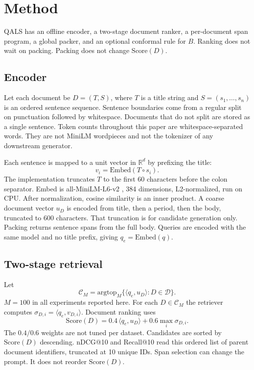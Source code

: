 \documentclass[preprint,12pt,authoryear]{elsarticle}
\begin{document}
\section{Method}
QALS has an offline encoder, a two-stage document ranker, a per-document span program, a global packer, and an optional conformal rule for \(B\). Ranking does not wait on packing. Packing does not change \(\mathrm{Score}(D)\).

\subsection{Encoder}
Let each document be \(D=(T,S)\), where \(T\) is a title string and \(S=(s_1,\ldots,s_n)\) is an ordered sentence sequence. Sentence boundaries come from a regular split on punctuation followed by whitespace. Documents that do not split are stored as a single sentence. Token counts throughout this paper are whitespace-separated words. They are not MiniLM wordpieces and not the tokenizer of any downstream generator.

Each sentence is mapped to a unit vector in \(\mathbb{R}^d\) by prefixing the title:
\begin{equation}
v_i=\mathrm{Embed}(T\circ s_i).
\end{equation}
The implementation truncates \(T\) to the first 60 characters before the colon separator. Embed is all-MiniLM-L6-v2 \citep{reimers2019sentence}, 384 dimensions, L2-normalized, run on CPU. After normalization, cosine similarity is an inner product. A coarse document vector \(u_D\) is encoded from title, then a period, then the body, truncated to 600 characters. That truncation is for candidate generation only. Packing returns sentence spans from the full body. Queries are encoded with the same model and no title prefix, giving \(q_e=\mathrm{Embed}(q)\).

\subsection{Two-stage retrieval}
Let
\begin{equation}
\mathcal{C}_M=\mathrm{argtop}_M\{\langle q_e,u_D\rangle:D\in\mathcal{D}\}.
\end{equation}
\(M=100\) in all experiments reported here. For each \(D\in\mathcal{C}_M\) the retriever computes \(\sigma_{D,i}=\langle q_e,v_{D,i}\rangle\). Document ranking uses
\begin{equation}
\mathrm{Score}(D)=0.4\,\langle q_e,u_D\rangle+0.6\max_i\sigma_{D,i}.
\end{equation}
The \(0.4/0.6\) weights are not tuned per dataset. Candidates are sorted by \(\mathrm{Score}(D)\) descending. nDCG@10 and Recall@10 read this ordered list of parent document identifiers, truncated at 10 unique IDs. Span selection can change the prompt. It does not reorder \(\mathrm{Score}(D)\).
\end{document}
